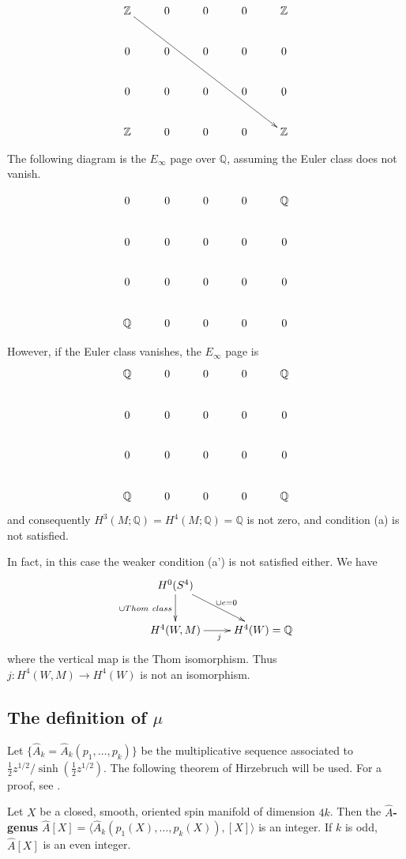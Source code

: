 \documentclass[twoside]{article}
\begin{document}
\[
\xymatrix{
	\mathbb{Z}\ar[rrrrddd]&0&0&0&\mathbb{Z}\\
	0&0&0&0&0\\
	0&0&0&0&0\\
	\mathbb{Z}&0&0&0&\mathbb{Z}
}
\]

The following diagram is the $E_\infty$ page over $\mathbb{Q}$, assuming the Euler class does not vanish. 

\[
\xymatrix{
	0&0&0&0&\mathbb{Q}\\
	0&0&0&0&0\\
	0&0&0&0&0\\
	\mathbb{Q}&0&0&0&0
}
\]





However, if the Euler class vanishes, the $E_\infty$ page is
\[
\xymatrix{
	\mathbb{Q}&0&0&0&\mathbb{Q}\\
	0&0&0&0&0\\
	0&0&0&0&0\\
	\mathbb{Q}&0&0&0&\mathbb{Q}
}
\]
and consequently $H^3(M;\mathbb{Q}) = H^4(M;\mathbb{Q}) = \mathbb{Q}$ is not zero, and condition (a) is not satisfied. 



In fact, in this case the weaker condition (a') is not satisfied either. We have
\[
\xymatrix{
	H^0(S^4)\ar[d]_{  \cup   Thom \ class}\ar[rd]^{  \cup   e = 0}& \\
	H^4(W,M)\ar[r]_j&H^4(W) = \mathbb{Q}\\
}
\]
where the vertical map is the Thom isomorphism. Thus $j \colon H^{4}(W,M) \to  H^{4}(W)$ is not an isomorphism. 

\subsection{The definition of \texorpdfstring{$\mu$}{mu}}

Let $ \{ \widehat{A}_k = \widehat{A}_k(p_1, \dots  ,p_k) \} $ be the multiplicative sequence associated to $\frac{1}{2}z^{1/2}/\operatorname{sinh}(\frac{1}{2}z^{1/2})$. The following theorem of Hirzebruch will be used. For a proof, see \cite{borelhirzebruch}. 

\begin{thm}
	Let $X$ be a closed, smooth, oriented spin manifold of dimension $4k$. Then the \textbf{$\widehat{A}$-genus} $\widehat{A}[X] = \langle\hat{A}_k(p_1(X), \dots  ,p_k(X)),[X]\rangle$ is an integer. If $k$ is odd, $\widehat{A}[X]$ is an even integer. 
\end{thm}
\end{document}
